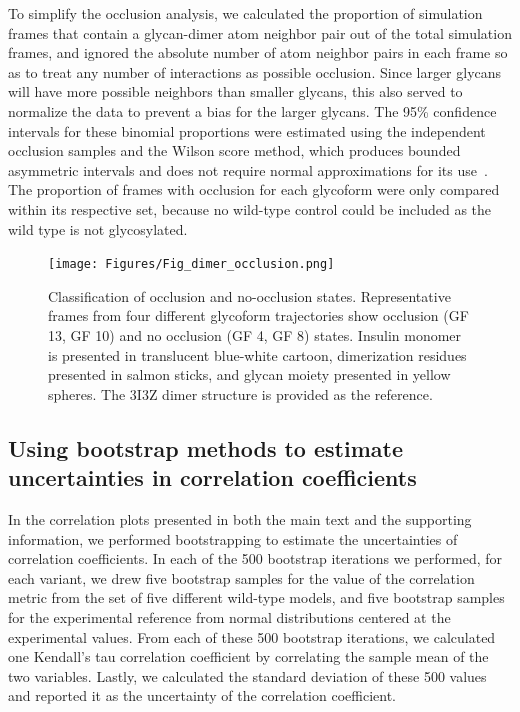 \documentclass[sn-vancouver]{sn-jnl}
\begin{document}
To simplify the occlusion analysis, we calculated the proportion of simulation frames that contain a glycan-dimer atom neighbor pair out of the total simulation frames, and ignored the absolute number of atom neighbor pairs in each frame so as to treat any number of interactions as possible occlusion. Since larger glycans will have more possible neighbors than smaller glycans, this also served to normalize the data to prevent a bias for the larger glycans. The 95\% confidence intervals for these binomial proportions were estimated using the independent occlusion samples and the Wilson score method, which produces bounded asymmetric intervals and does not require normal approximations for its use~\cite{wilson1927score, newcombe1998intervals, wallis2013binomialscores}. The proportion of frames with occlusion for each glycoform were only compared within its respective set, because no wild-type control could be included as the wild type is not glycosylated.

\begin{figure}[H]
\centering
\texttt{[image: Figures/Fig\_dimer\_occlusion.png]}
\caption{Classification of occlusion and no-occlusion states. Representative frames from four different glycoform trajectories show occlusion (GF 13, GF 10) and no occlusion (GF 4, GF 8) states. Insulin monomer is presented in translucent blue-white cartoon, dimerization residues presented in salmon sticks, and glycan moiety presented in yellow spheres. The 3I3Z dimer structure is provided as the reference.}
\label{occlusion}
\end{figure}

\subsection{Using bootstrap methods to estimate uncertainties in correlation coefficients} \label{bootstrap}
In the correlation plots presented in both the main text and the supporting information, we performed bootstrapping to estimate the uncertainties of correlation coefficients.  In each of the 500 bootstrap iterations we performed, for each variant, we drew five bootstrap samples for the value of the correlation metric from the set of five different wild-type models, and five bootstrap samples for the experimental reference from normal distributions centered at the experimental values. From each of these 500 bootstrap iterations, we calculated one Kendall's tau correlation coefficient by correlating the sample mean of the two variables. Lastly, we calculated the standard deviation of these 500 values and reported it as the uncertainty of the correlation coefficient. 
\end{document}
